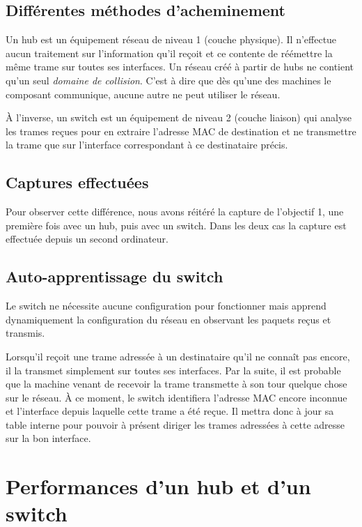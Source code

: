 \documentclass[11pt,a4paper]{article}
\begin{document}
\subsection{Différentes méthodes d'acheminement}

Un hub est un équipement réseau de niveau 1 (couche physique). Il n'effectue aucun traitement sur l'information qu'il reçoit et ce contente de réémettre la même trame sur toutes ses interfaces. Un réseau créé à partir de hubs ne contient qu'un seul \textit{domaine de collision}. C'est à dire que dès qu'une des machines le composant communique, aucune autre ne peut utiliser le réseau.

À l'inverse, un switch est un équipement de niveau 2 (couche liaison) qui analyse les trames reçues pour en extraire l'adresse MAC de destination et ne transmettre la trame que sur l'interface correspondant à ce destinataire précis.

\subsection{Captures effectuées}

Pour observer cette différence, nous avons réitéré la capture de l'objectif 1, une première fois avec un hub, puis avec un switch. Dans les deux cas la capture est effectuée depuis un second ordinateur.

\subsection{Auto-apprentissage du switch}

Le switch ne nécessite aucune configuration pour fonctionner mais apprend dynamiquement la configuration du réseau en observant les paquets reçus et transmis.

Lorsqu'il reçoit une trame adressée à un destinataire qu'il ne connaît pas encore, il la transmet simplement sur toutes ses interfaces. Par la suite, il est probable que la machine venant de recevoir la trame transmette à son tour quelque chose sur le réseau. À ce moment, le switch identifiera l'adresse MAC encore inconnue et l'interface depuis laquelle cette trame a été reçue. Il mettra donc à jour sa table interne pour pouvoir à présent diriger les trames adressées à cette adresse sur la bon interface.

\section{Performances d'un hub et d'un switch}
\end{document}

